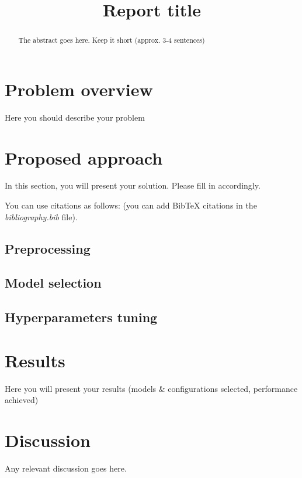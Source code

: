 \documentclass[conference]{IEEEtran}
\begin{document}
\title{Report title}

\author{
}

\author{
}

\maketitle

\begin{abstract}
The abstract goes here. Keep it short (approx. 3-4 sentences)
\end{abstract}

\section{Problem overview}
Here you should describe your problem

\section{Proposed approach}
In this section, you will present your solution. Please fill in accordingly.

You can use citations as follows: \cite{goodfellow2016deep} (you can add BibTeX citations in the \textit{bibliography.bib} file).

\subsection{Preprocessing}
\subsection{Model selection}
\subsection{Hyperparameters tuning}

\section{Results}
Here you will present your results (models \& configurations selected, performance achieved)

\section{Discussion}
Any relevant discussion goes here.



\end{document}
